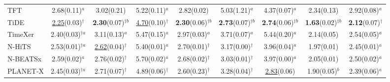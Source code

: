 \begin{table}[!t]
\begin{adjustbox}{max width=\linewidth}
\begin{tabular}{lcccccccc}
TFT & 2.68{\scriptsize\color{gray}(0.11)}$^{a}$ & 3.02{\scriptsize\color{gray}(0.21)} & 5.22{\scriptsize\color{gray}(0.11)}$^{a}$ & 2.82{\scriptsize\color{gray}(0.02)} & 5.03{\scriptsize\color{gray}(1.21)}$^{a}$ & 4.37{\scriptsize\color{gray}(0.07)}$^{a}$ & 2.34{\scriptsize\color{gray}(0.13)} & 2.92{\scriptsize\color{gray}(0.08)}$^{a}$ \\
TiDE & \underline{2.25}{\scriptsize\color{gray}(0.03)}$^{\dagger{}}$ & \textbf{2.30}{\scriptsize\color{gray}(0.07)}$^{\dagger{}b}$ & \underline{4.70}{\scriptsize\color{gray}(0.10)}$^{\dagger{}}$ & \textbf{2.30}{\scriptsize\color{gray}(0.06)}$^{\dagger{}b}$ & \textbf{2.73}{\scriptsize\color{gray}(0.07)}$^{\dagger{}b}$ & \textbf{2.74}{\scriptsize\color{gray}(0.06)}$^{\dagger{}b}$ & \textbf{1.63}{\scriptsize\color{gray}(0.02)}$^{\dagger{}b}$ & \textbf{2.12}{\scriptsize\color{gray}(0.07)}$^{\dagger{}}$ \\
TimeXer & 2.40{\scriptsize\color{gray}(0.03)}$^{\dagger{}a}$ & 3.11{\scriptsize\color{gray}(0.13)}$^{a}$ & 5.47{\scriptsize\color{gray}(0.15)}$^{a}$ & 2.97{\scriptsize\color{gray}(0.03)}$^{a}$ & 3.71{\scriptsize\color{gray}(0.07)}$^{a}$ & 5.44{\scriptsize\color{gray}(0.20)}$^{a}$ & 2.14{\scriptsize\color{gray}(0.05)} & 2.54{\scriptsize\color{gray}(0.05)}$^{a}$ \\
N-HiTS & 2.53{\scriptsize\color{gray}(0.01)}$^{\dagger{}a}$ & \underline{2.62}{\scriptsize\color{gray}(0.04)}$^{\dagger{}}$ & 5.40{\scriptsize\color{gray}(0.01)}$^{a}$ & 2.70{\scriptsize\color{gray}(0.01)}$^{\dagger{}}$ & 3.17{\scriptsize\color{gray}(0.00)}$^{\dagger{}}$ & 3.96{\scriptsize\color{gray}(0.04)}$^{a}$ & 1.97{\scriptsize\color{gray}(0.01)} & 2.45{\scriptsize\color{gray}(0.01)}$^{a}$ \\
N-BEATSx & 2.59{\scriptsize\color{gray}(0.02)}$^{a}$ & 2.76{\scriptsize\color{gray}(0.02)}$^{\dagger{}}$ & 5.70{\scriptsize\color{gray}(0.02)}$^{a}$ & 2.68{\scriptsize\color{gray}(0.02)}$^{\dagger{}}$ & 3.03{\scriptsize\color{gray}(0.01)}$^{\dagger{}}$ & 3.97{\scriptsize\color{gray}(0.00)}$^{a}$ & 2.05{\scriptsize\color{gray}(0.01)} & 2.50{\scriptsize\color{gray}(0.02)}$^{a}$ \\
PLANET-X & 2.45{\scriptsize\color{gray}(0.03)}$^{\dagger{}a}$ & 2.71{\scriptsize\color{gray}(0.07)}$^{\dagger{}}$ & 4.89{\scriptsize\color{gray}(0.06)}$^{\dagger{}}$ & 2.60{\scriptsize\color{gray}(0.23)}$^{\dagger{}}$ & 3.28{\scriptsize\color{gray}(0.04)}$^{\dagger{}}$ & \underline{2.83}{\scriptsize\color{gray}(0.06)} & 1.90{\scriptsize\color{gray}(0.05)}$^{b}$ & 2.39{\scriptsize\color{gray}(0.06)}$^{a}$ \\

\end{tabular}
\end{adjustbox}
\end{table}
